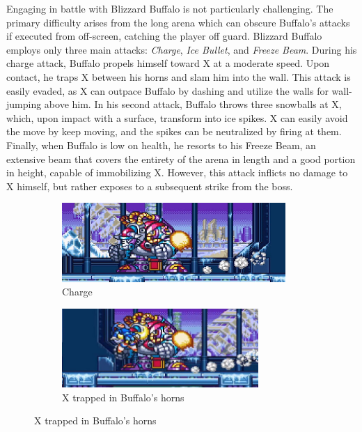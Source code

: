 Engaging in battle with Blizzard Buffalo is not particularly challenging. The primary difficulty arises from the long arena which can obscure Buffalo's attacks if executed from off-screen, catching the player off guard. Blizzard Buffalo employs only three main attacks: \emph{Charge}, \emph{Ice Bullet}, and \emph{Freeze Beam}. During his charge attack, Buffalo propels himself toward X at a moderate speed. Upon contact, he traps X between his horns and slam him into the wall. This attack is easily evaded, as X can outpace Buffalo by dashing and utilize the walls for wall-jumping above him. In his second attack, Buffalo throws three snowballs at X, which, upon impact with a surface, transform into ice spikes. X can easily avoid the move by keep moving, and the spikes can be neutralized by firing at them. Finally, when Buffalo is low on health, he resorts to his Freeze Beam, an extensive beam that covers the entirety of the arena in length and a good portion in height, capable of immobilizing X. However, this attack inflicts no damage to X himself, but rather exposes to a subsequent strike from the boss.
\begin{figure}[htp]
	\centering
	\begin{subfigure}{\linewidth}
		\centering
		\includegraphics[height=3cm]{figures/X3/Blizzard_buffalo/Buffalo_charge.jpg}
		\caption{Charge}
	\end{subfigure}
	\begin{subfigure}{\linewidth}
		\centering
		\includegraphics[height=3cm]{figures/X3/Blizzard_buffalo/Buffalo_charge_2.jpg}
		\caption{X trapped in Buffalo's horns}
	\end{subfigure}
\end{figure}
